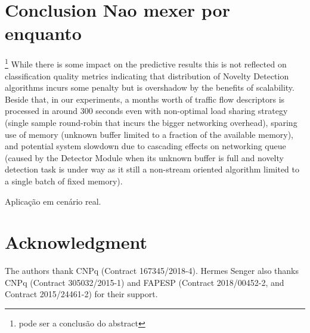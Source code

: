 
\section{Conclusion {\color{red} Nao mexer por enquanto}} 
\label{sec:conclusion}

\footnote{\color{red} pode ser a conclusão do abstract}
While there is some impact on the predictive results this is not reflected on
classification quality metrics indicating that distribution of Novelty Detection
algorithms incurs some penalty but is overshadow by the benefits of scalability.
Beside that, in our experiments, a months worth of traffic flow descriptors is
processed in around $300$ seconds even with non-optimal load sharing strategy
(single sample round-robin that incurs the bigger networking overhead),
sparing use of memory (unknown buffer limited to a fraction of the available memory),
and potential system slowdown due to cascading effects on networking queue
(caused by the Detector Module when its unknown buffer is full and novelty
detection task is under way as it still a non-stream oriented algorithm limited
to a single batch of fixed memory).

Aplicação em cenário real.

\section*{Acknowledgment}

The authors thank CNPq (Contract 167345/2018-4).
Hermes Senger also thanks CNPq (Contract 305032/2015-1) and FAPESP (Contract
2018/00452-2, and Contract 2015/24461-2) for their support.

